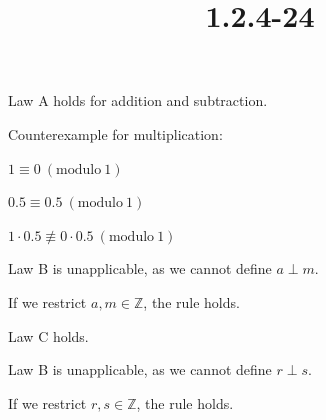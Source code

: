 \documentclass{article}
\title{1.2.4-24}
\begin{document}
\maketitle

Law A holds for addition and subtraction.

Counterexample for multiplication:

\( 1 \equiv 0\ (\mathrm{modulo}\ 1) \)

\( 0.5 \equiv 0.5\ (\mathrm{modulo}\ 1) \)

\( 1 \cdot 0.5 \not\equiv 0 \cdot 0.5\ (\mathrm{modulo}\ 1) \)

Law B is unapplicable, as we cannot define \( a \perp m \).

If we restrict \( a, m \in \mathbb{Z} \), the rule holds.

Law C holds.

Law B is unapplicable, as we cannot define \( r \perp s \).

If we restrict \( r, s \in \mathbb{Z} \), the rule holds.
\end{document}
